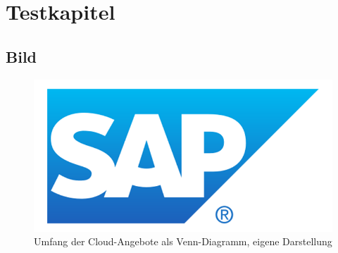 \seInhaltsverzeichnis[
einrueckung=ja,
gliederungsebenen=4
]





\chapter{Testkapitel}

\section{Bild}

\begin{figure}[h]
\centering
\setlength{\unitlength}{1mm}
\includegraphics[width=15cm]{images/sap-logo.png}
\caption[Umfang der Cloud-Angebote als Venn-Diagramm]{Umfang der Cloud-Angebote als Venn-Diagramm, eigene Darstellung\label{fig:grundlagen:venn}}
\end{figure}

